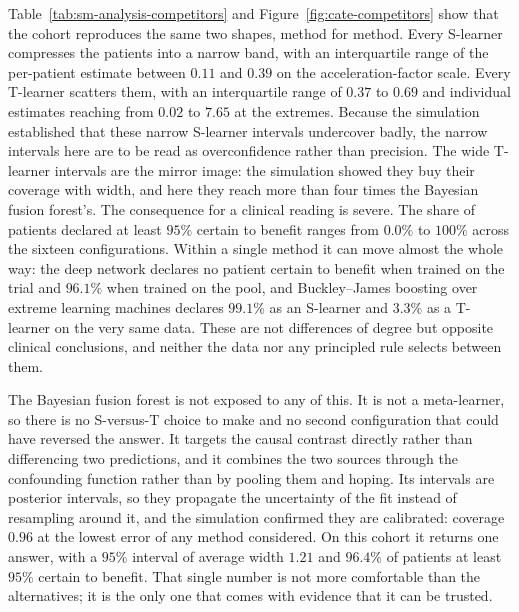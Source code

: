 Table~\ref{tab:sm-analysis-competitors} and Figure~\ref{fig:cate-competitors} show that the cohort reproduces the same two shapes, method for method.
Every S-learner compresses the patients into a narrow band, with an interquartile range of the per-patient estimate between $0.11$ and $0.39$ on the acceleration-factor scale.
Every T-learner scatters them, with an interquartile range of $0.37$ to $0.69$ and individual estimates reaching from $0.02$ to $7.65$ at the extremes.
Because the simulation established that these narrow S-learner intervals undercover badly, the narrow intervals here are to be read as overconfidence rather than precision.
The wide T-learner intervals are the mirror image: the simulation showed they buy their coverage with width, and here they reach more than four times the Bayesian fusion forest's.
The consequence for a clinical reading is severe.
The share of patients declared at least $95\%$ certain to benefit ranges from $0.0\%$ to $100\%$ across the sixteen configurations.
Within a single method it can move almost the whole way: the deep network declares no patient certain to benefit when trained on the trial and $96.1\%$ when trained on the pool, and Buckley--James boosting over extreme learning machines declares $99.1\%$ as an S-learner and $3.3\%$ as a T-learner on the very same data.
These are not differences of degree but opposite clinical conclusions, and neither the data nor any principled rule selects between them.

The Bayesian fusion forest is not exposed to any of this.
It is not a meta-learner, so there is no S-versus-T choice to make and no second configuration that could have reversed the answer.
It targets the causal contrast directly rather than differencing two predictions, and it combines the two sources through the confounding function rather than by pooling them and hoping.
Its intervals are posterior intervals, so they propagate the uncertainty of the fit instead of resampling around it, and the simulation confirmed they are calibrated: coverage $0.96$ at the lowest error of any method considered.
On this cohort it returns one answer, with a $95\%$ interval of average width $1.21$ and $96.4\%$ of patients at least $95\%$ certain to benefit.
That single number is not more comfortable than the alternatives; it is the only one that comes with evidence that it can be trusted.

